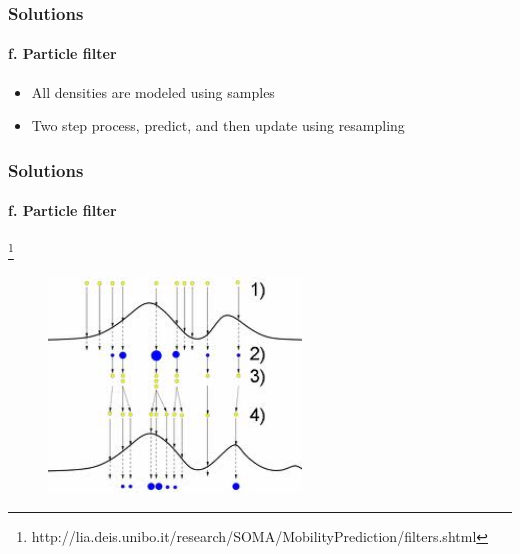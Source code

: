 \documentclass{beamer}
\begin{document}
%











\begin{frame}
\frametitle{Solutions}
\framesubtitle{f. Particle filter}
\mypagenum
\begin{itemize}
\item All densities are modeled using samples
\item Two step process, predict, and then update using resampling
\end{itemize}
\end{frame}




\begin{frame}
\frametitle{Solutions}
\framesubtitle{f. Particle filter}
\mypagenum
\footnote{\tiny http://lia.deis.unibo.it/research/SOMA/MobilityPrediction/filters.shtml}
\begin{figure}
\includegraphics[width=0.6\textwidth]{figs/PRML_update.jpg}
\end{figure}
\end{frame}
\end{document}
